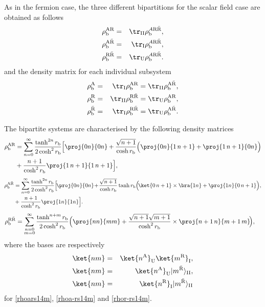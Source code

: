 As in the fermion case, the three different bipartitions for the scalar field case are obtained as follows
\begin{eqnarray}
\label{AR1}\rho^\text{AR}_\text{b}&=&\tr_{\text{II}}\rho^{A\text{R}{\bar{\text{R}}}}_\text{b},\\*
\label{AAR1}\rho^{\text{A}{\bar{\text{R}}}}_\text{b}&=&\tr_\text{I}\rho^{A\text{R}{\bar{\text{R}}}}_\text{b},\\*
\label{RAR1}\rho^{\text{R}{\bar{\text{R}}}}_\text{b}&=&\tr_\text{U}\rho^{A\text{R}{\bar{\text{R}}}}_\text{b}.
\end{eqnarray}
and the density matrix for each individual subsystem
 \begin{eqnarray}
\label{A1}\rho^{\text{A}}_\text{b}&=&\tr_\text{I}\rho^\text{AR}_\text{b}=\tr_{\text{II}}\rho^{\text{A}{\bar{\text{R}}}}_\text{b},\\*
\label{R1}\rho^{\text{R}}_\text{b}&=&\tr_{\text{II}}\rho^{\text{R}{\bar{\text{R}}}}_\text{b}=\tr_\text{U}\rho^\text{AR}_\text{b},\\*
\label{aR1}\rho^{{\bar{\text{R}}}}_\text{b}&=&\tr_\text{I}\rho^{\text{R}{\bar{\text{R}}}}_\text{b}=\tr_\text{U}\rho^{\text{A}{\bar{\text{R}}}}_\text{b}.
\end{eqnarray}

The bipartite systems are characterised by the following density matrices
\begin{align}\label{rhoars14m}
\nonumber\rho^\text{AR}_\text{b}&=\sum_{n=0}^{\infty}\frac{\tanh^{2n}r_\text{b}}{2\cosh^2 r_\text{b}}\Big[\proj{0n}{0n}+\frac{\sqrt{n+1}}{\cosh r_\text{b}}\Big(\proj{0n}{1\, n+1}+\proj{1\, n+1}{0n}\Big)\\*
&+\frac{n+1}{\cosh^2 r_\text{b}}\proj{1\,n+1}{1\,n+1}\Big],
\end{align}
\begin{align}\label{rhoa-rs14m}
\nonumber\rho^{\text{A}{\bar{\text{R}}}}_\text{b}&=\sum_{n=0}^{\infty}\frac{\tanh^{2n}r_\text{b}}{2\cosh^2 r_\text{b}}\Big[\!\proj{0n}{0n}\!+\!\frac{\sqrt{n+1}}{\cosh r_\text{b}}\tanh r_\text{b}\Big(\!\ket{0\,n+1}\times\bra{1 n}+\proj{1 n}{0\,n+1}\Big),\\*
&+\frac{n+1}{\cosh^2 r_\text{b}}\proj{1n}{1n}\Big].
\end{align}
\begin{align}\label{rhor-rs14m}
\rho^{\text{R}{\bar{\text{R}}}}_\text{b}&=\sum_{\substack{n=0\\m=0}}^{\infty}\frac{\tanh^{n+m}r_\text{b}}{2\cosh^2 r_\text{b}}\Big(\proj{nn}{mm}+\frac{\sqrt{n+1}\sqrt{m+1}}{\cosh^2 r_\text{b}}\times\proj{n+1\,n}{m+1\,m}\!\Big),
\end{align}
where the bases are respectively
\begin{eqnarray}\label{barbolbasis}
 \ket{nm}&=&\ket{n^\text{A}}_\text{U}\ket{m^\text{R}}_\text{I},\\*
\ket{nm}&=&\ket{n^\text{A}}_\text{U}|m^{{\bar{\text{R}}}}\rangle_{\text{II}},\\*
\ket{nm}&=&\ket{n^\text{R}}_\text{I}|m^{{\bar{\text{R}}}}\rangle_{\text{II}}
\end{eqnarray}
for \eqref{rhoars14m}, \eqref{rhoa-rs14m} and \eqref{rhor-rs14m}.

